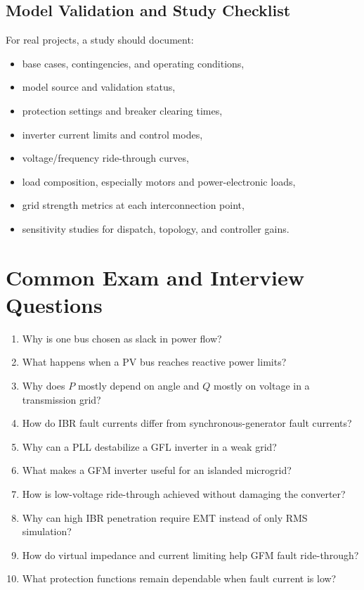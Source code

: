 \documentclass[11pt]{article}
\begin{document}
\subsection{Model Validation and Study Checklist}
For real projects, a study should document:
\begin{itemize}
  \item base cases, contingencies, and operating conditions,
  \item model source and validation status,
  \item protection settings and breaker clearing times,
  \item inverter current limits and control modes,
  \item voltage/frequency ride-through curves,
  \item load composition, especially motors and power-electronic loads,
  \item grid strength metrics at each interconnection point,
  \item sensitivity studies for dispatch, topology, and controller gains.
\end{itemize}

\section{Common Exam and Interview Questions}

\begin{enumerate}
  \item Why is one bus chosen as slack in power flow?
  \item What happens when a PV bus reaches reactive power limits?
  \item Why does $P$ mostly depend on angle and $Q$ mostly on voltage in a
  transmission grid?
  \item How do IBR fault currents differ from synchronous-generator fault currents?
  \item Why can a PLL destabilize a GFL inverter in a weak grid?
  \item What makes a GFM inverter useful for an islanded microgrid?
  \item How is low-voltage ride-through achieved without damaging the converter?
  \item Why can high IBR penetration require EMT instead of only RMS simulation?
  \item How do virtual impedance and current limiting help GFM fault ride-through?
  \item What protection functions remain dependable when fault current is low?
\end{enumerate}
\end{document}
